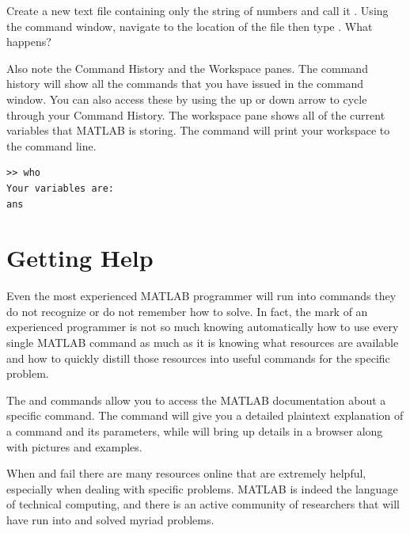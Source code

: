 \begin{problem}
Create a new text file containing only the string of numbers  and call it .  Using the command window, navigate to the location of the file then type .  What happens?
\end{problem}

Also note the Command History and the Workspace panes.  The command history will show all the commands that you have issued in the command window.  You can also access these by using the up or down arrow to cycle through your Command History.  The workspace pane shows all of the current variables that MATLAB is storing.  The  command will print your workspace to the command line.

\begin{lstlisting}[style=matlab]
>> who
Your variables are:
ans
\end{lstlisting}

\section*{Getting Help}

Even the most experienced MATLAB programmer will run into commands they do not recognize or do not remember how to solve.  In fact, the mark of an experienced programmer is not so much knowing automatically how to use every single MATLAB command as much as it is knowing what resources are available and how to quickly distill those resources into useful commands for the specific problem.

The  and  commands allow you to access the MATLAB documentation about a specific command.  The  command will give you a detailed plaintext explanation of a command and its parameters, while  will bring up details in a browser along with pictures and examples.

When  and  fail there are many resources online that are extremely helpful, especially when dealing with specific problems.  MATLAB is indeed the language of technical computing, and there is an active community of researchers that will have run into and solved myriad problems.  %


